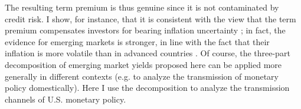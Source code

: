 {The resulting term premium is thus genuine since it is not contaminated by credit risk.
I show, for instance, that it is consistent with %
the view that the term premium compensates investors for bearing inflation uncertainty \citep{Wright:2011}; in fact, the evidence for emerging markets is stronger, in line with the fact that their inflation %
is more volatile than in advanced countries \citep{HaKoseOhnsorge:2019}.
Of course, the three-part decomposition of emerging market yields proposed here can be applied more generally in different contexts
(e.g. to analyze the transmission of monetary policy domestically).
Here I use the decomposition to analyze the transmission channels of U.S. monetary policy.


}

